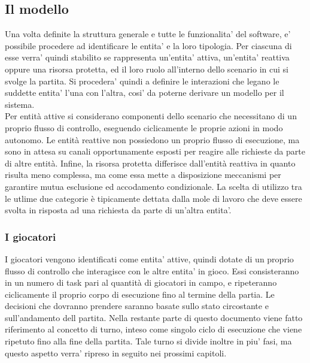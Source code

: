 \subsection{Il modello}
\label{sec:entita_coinvolte}

Una volta definite la struttura generale e tutte le funzionalita' del software, e' possibile procedere ad identificare le entita' e la loro tipologia. Per ciascuna di esse verra' quindi stabilito se rappresenta un'entita' attiva, un'entita' reattiva oppure una risorsa protetta, ed il loro ruolo all'interno dello scenario in cui si svolge la partita. Si procedera' quindi a definire le interazioni che legano le suddette entita' l'una con l'altra, cosi' da poterne derivare un modello per il sistema.\\

Per entità attive si considerano componenti dello scenario che necessitano di un proprio flusso di controllo, eseguendo ciclicamente le proprie azioni in modo autonomo. Le entità reattive non possiedono un proprio flusso di esecuzione, ma sono in attesa su canali opportunamente esposti per reagire alle richieste da parte di altre entità. Infine, la risorsa protetta differisce dall'entità reattiva in quanto risulta meno complessa, ma come essa mette a disposizione meccanismi per garantire mutua esclusione ed accodamento condizionale. La scelta di utilizzo tra le utlime due categorie è tipicamente dettata dalla mole di lavoro che deve essere svolta in risposta ad una richiesta da parte di un'altra entita'.

\subsubsection{I giocatori}
\label{sec:entita_coinvolte_giocatori}

I giocatori vengono identificati come entita' attive, quindi dotate di un proprio flusso di controllo che interagisce con le altre entita' in gioco. Essi consisteranno in un numero di task pari al quantità di giocatori in campo, e ripeteranno ciclicamente il proprio corpo di esecuzione fino al termine della partia. Le decisioni che dovranno prendere saranno basate sullo stato circostante e sull'andamento dell partita. Nella restante parte di questo documento viene fatto riferimento al concetto di turno, inteso come singolo ciclo di esecuzione che viene ripetuto fino alla fine della partita. Tale turno si divide inoltre in piu' fasi, ma questo aspetto verra' ripreso in seguito nei prossimi capitoli.

